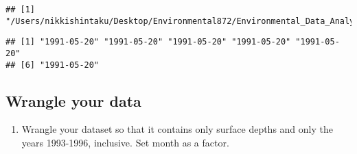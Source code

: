 \documentclass[]{article}
\newenvironment{Shaded}{\begin{snugshade}}{\end{snugshade}}
\newcommand{\CommentTok}[1]{\textcolor[rgb]{0.56,0.35,0.01}{\textit{#1}}}
\newcommand{\DataTypeTok}[1]{\textcolor[rgb]{0.13,0.29,0.53}{#1}}
\newcommand{\KeywordTok}[1]{\textcolor[rgb]{0.13,0.29,0.53}{\textbf{#1}}}
\newcommand{\NormalTok}[1]{#1}
\newcommand{\OperatorTok}[1]{\textcolor[rgb]{0.81,0.36,0.00}{\textbf{#1}}}
\newcommand{\StringTok}[1]{\textcolor[rgb]{0.31,0.60,0.02}{#1}}
\providecommand{\tightlist}{%
  \setlength{\itemsep}{0pt}\setlength{\parskip}{0pt}}
\begin{document}
\begin{Shaded}
\end{Shaded}

\begin{verbatim}
## [1] "/Users/nikkishintaku/Desktop/Environmental872/Environmental_Data_Analytics_2020"
\end{verbatim}

\begin{Shaded}
\end{Shaded}

\begin{verbatim}
## [1] "1991-05-20" "1991-05-20" "1991-05-20" "1991-05-20" "1991-05-20"
## [6] "1991-05-20"
\end{verbatim}

\hypertarget{wrangle-your-data}{%
\subsection{Wrangle your data}\label{wrangle-your-data}}

\begin{enumerate}
\def\labelenumi{\arabic{enumi}.}
\setcounter{enumi}{2}
\tightlist
\item
  Wrangle your dataset so that it contains only surface depths and only
  the years 1993-1996, inclusive. Set month as a factor.
\end{enumerate}
\end{document}
